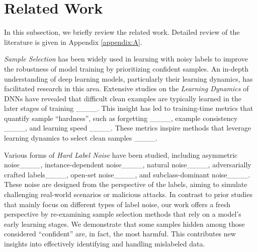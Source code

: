 \section{Related Work}
In this subsection, we briefly review the related work. Detailed review of the literature is given in Appendix \ref{appendix:A}.

\emph{Sample Selection} has been widely used in learning with noisy labels to improve the robustness of model training by prioritizing confident samples. An in-depth understanding of deep learning models, particularly their learning dynamics, has facilitated research in this area. Extensive studies on the \emph{Learning Dynamics} of DNNs have revealed that difficult clean examples are typically learned in the later stages of training ____. This insight has led to training-time metrics that quantify sample ``hardness'', such as forgetting ____, example consistency ____, and learning speed ____. These metrics inspire methods that leverage learning dynamics to select clean samples ____.

Various forms of \emph{Hard Label Noise} have been studied, including asymmetric noise____, instance-dependent noise____, natural noise____, adversarially crafted labels____, open-set noise____, and subclass-dominant noise____. These noise are designed from the perspective of the labels, aiming to simulate challenging real-world scenarios or malicious attacks. 
In contrast to prior studies that mainly focus on different types of label noise, our work offers a fresh perspective by re-examining sample selection methods that rely on a model's early learning stages. We demonstrate that some samples hidden among those considered ``confident'' are, in fact, the most harmful. This contributes new insights into effectively identifying and handling mislabeled data.